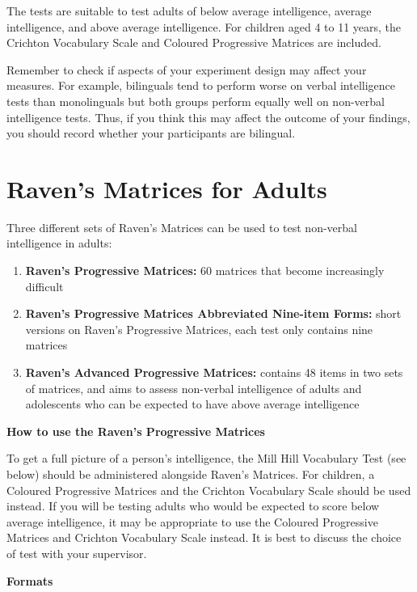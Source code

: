 \documentclass[
]{book}
\providecommand{\tightlist}{%
  \setlength{\itemsep}{0pt}\setlength{\parskip}{0pt}}
\begin{document}
The tests are suitable to test adults of below average intelligence, average intelligence, and above average intelligence. For children aged 4 to 11 years, the Crichton Vocabulary Scale and Coloured Progressive Matrices are included.

Remember to check if aspects of your experiment design may affect your measures. For example, bilinguals tend to perform worse on verbal intelligence tests than monolinguals but both groups perform equally well on non-verbal intelligence tests. Thus, if you think this may affect the outcome of your findings, you should record whether your participants are bilingual.

\hypertarget{ravens-matrices-for-adults}{%
\section{Raven's Matrices for Adults}\label{ravens-matrices-for-adults}}

Three different sets of Raven's Matrices can be used to test non-verbal intelligence in adults:

\begin{enumerate}
\def\labelenumi{\arabic{enumi}.}
\tightlist
\item
  \textbf{Raven's Progressive Matrices:} 60 matrices that become increasingly difficult
\item
  \textbf{Raven's Progressive Matrices Abbreviated Nine-item Forms:} short versions on Raven's Progressive Matrices, each test only contains nine matrices
\item
  \textbf{Raven's Advanced Progressive Matrices:} contains 48 items in two sets of matrices, and aims to assess non-verbal intelligence of adults and adolescents who can be expected to have above average intelligence
\end{enumerate}

\textbf{How to use the Raven's Progressive Matrices}

To get a full picture of a person's intelligence, the Mill Hill Vocabulary Test (see below) should be administered alongside Raven's Matrices. For children, a Coloured Progressive Matrices and the Crichton Vocabulary Scale should be used instead. If you will be testing adults who would be expected to score below average intelligence, it may be appropriate to use the Coloured Progressive Matrices and Crichton Vocabulary Scale instead. It is best to discuss the choice of test with your supervisor.

\textbf{Formats}
\end{document}
